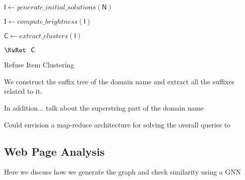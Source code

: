 \begin{algorithm}[pth]
    \DontPrintSemicolon

    $\mathsf{I} \gets \mathit{generate\_initial\_solutions}(\mathsf{N})$\;

    $\mathrm{I} \gets \mathit{compute\_brightness}(\mathsf{I})$\;

    
    $\mathsf{C}\gets\mathit{extract\_clusters}(\mathsf{I})$\;

    $\KwRet~~\mathsf{C}$\;

    \;

\caption{Refuse Item Clustering}
\label{alg:fa-clustering}
\end{algorithm}


We construct the suffix tree of the domain name and extract all the suffixes related to it.

In addition... talk about the superstring part of the domain name

Could envision a map-reduce architecture for solving the overall queries to 



\subsection{Web Page Analysis} %
\label{sub:approach-web-page-analysis}

Here we discuss how we generate the graph and check similarity using a GNN



